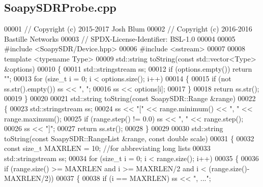 \subsection{Soapy\+S\+D\+R\+Probe.\+cpp}
\label{SoapySDRProbe_8cpp_source}

\begin{DoxyCode}
00001 \textcolor{comment}{// Copyright (c) 2015-2017 Josh Blum}
00002 \textcolor{comment}{// Copyright (c) 2016-2016 Bastille Networks}
00003 \textcolor{comment}{// SPDX-License-Identifier: BSL-1.0}
00004 
00005 \textcolor{preprocessor}{#include <SoapySDR/Device.hpp>}
00006 \textcolor{preprocessor}{#include <sstream>}
00007 
00008 \textcolor{keyword}{template} <\textcolor{keyword}{typename} Type>
00009 std::string toString(\textcolor{keyword}{const} std::vector<Type> &options)
00010 \{
00011     std::stringstream ss;
00012     \textcolor{keywordflow}{if} (options.empty()) \textcolor{keywordflow}{return} \textcolor{stringliteral}{""};
00013     \textcolor{keywordflow}{for} (\textcolor{keywordtype}{size\_t} i = 0; i < options.size(); i++)
00014     \{
00015         \textcolor{keywordflow}{if} (not ss.str().empty()) ss << \textcolor{stringliteral}{", "};
00016         ss << options[i];
00017     \}
00018     \textcolor{keywordflow}{return} ss.str();
00019 \}
00020 
00021 std::string toString(\textcolor{keyword}{const} SoapySDR::Range &range)
00022 \{
00023     std::stringstream ss;
00024     ss << \textcolor{stringliteral}{"["} << range.minimum() << \textcolor{stringliteral}{", "} << range.maximum();
00025     \textcolor{keywordflow}{if} (range.step() != 0.0) ss << \textcolor{stringliteral}{", "} << range.step();
00026     ss << \textcolor{stringliteral}{"]"};
00027     \textcolor{keywordflow}{return} ss.str();
00028 \}
00029 
00030 std::string toString(\textcolor{keyword}{const} SoapySDR::RangeList &range, \textcolor{keyword}{const} \textcolor{keywordtype}{double} scale)
00031 \{
00032     \textcolor{keyword}{const} \textcolor{keywordtype}{size\_t} MAXRLEN = 10; \textcolor{comment}{//for abbreviating long lists}
00033     std::stringstream ss;
00034     \textcolor{keywordflow}{for} (\textcolor{keywordtype}{size\_t} i = 0; i < range.size(); i++)
00035     \{
00036         \textcolor{keywordflow}{if} (range.size() >= MAXRLEN and i >= MAXRLEN/2 and i < (range.size()-MAXRLEN/2))
00037         \{
00038             \textcolor{keywordflow}{if} (i == MAXRLEN) ss << \textcolor{stringliteral}{", ..."};

\end{DoxyCode}

